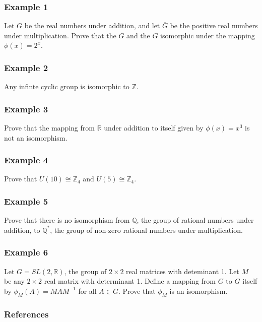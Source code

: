 \documentclass{beamer}
\begin{document}
\begin{frame}
    \frametitle{Example 1}

    Let \(G\) be the real numbers under addition, and let \(\overline{G}\) be the positive real numbers under multiplication. Prove that the \(G\) and the \(\overline{G}\) isomorphic under the mapping \(\phi(x)=2^x\). 

\end{frame}

\begin{frame}
    \frametitle{Example 2}

    Any infinte cyclic group is isomorphic to \(\mathbb{Z}\). 

\end{frame}

\begin{frame}
    \frametitle{Example 3}

    Prove that the mapping from \(\mathbb{R}\) under addition to itself given by \(\phi(x)=x^3\) is not an isomorphism.

\end{frame}

\begin{frame}
    \frametitle{Example 4}

    Prove that \(U(10) \cong \mathbb{Z}_4\) and \(U(5)\cong \mathbb{Z}_4\). 

\end{frame}

\begin{frame}
    \frametitle{Example 5}

    Prove that there is no isomorphism from \(\mathbb{Q}\), the group of rational numbers under addition, to \(\mathbb{Q}^*\), the group of non-zero rational numbers under multiplication. 

\end{frame}

\begin{frame}
    \frametitle{Example 6}

    Let \(G=SL(2, \mathbb{R})\), the group of \(2 \times 2\) real matrices with deteminant 1. Let \(M\) be any \(2 \times 2\) real matrix with determinant 1. Define a mapping from \(G\) to \(G\) itself by \(\phi_M(A)=MAM^{-1}\) for all \(A \in G\). Prove that \(\phi_M\) is an isomorphism.

\end{frame}


\begin{frame}
    \frametitle{References}
\end{frame}
\end{document}
